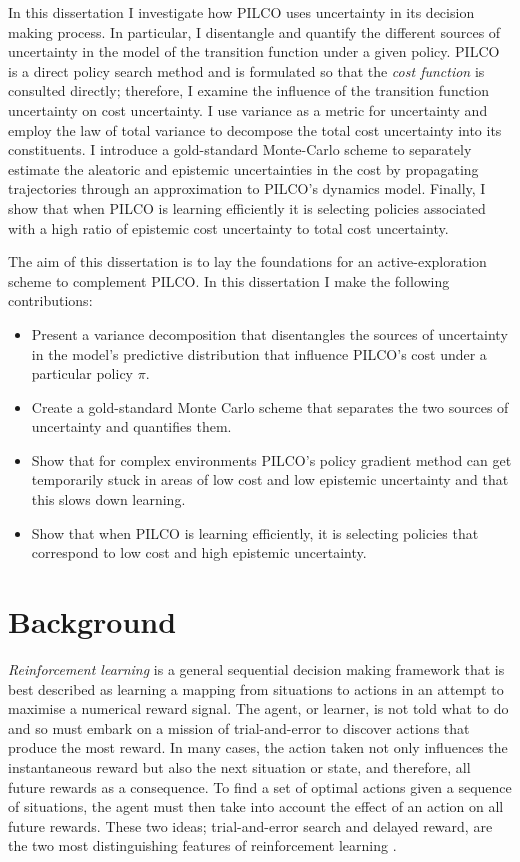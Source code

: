 In this dissertation I investigate how PILCO uses uncertainty in its decision making process. In particular, I disentangle and quantify the different sources of uncertainty in the model of the transition function under a given policy. PILCO is a direct policy search method and is formulated so that the \textit{cost function} is consulted directly; therefore, I examine the influence of the transition function uncertainty on cost uncertainty. I use variance as a metric for uncertainty and employ the law of total variance to decompose the total cost uncertainty into its constituents. I introduce a gold-standard Monte-Carlo scheme to separately estimate the aleatoric and epistemic uncertainties in the cost by propagating trajectories through an approximation to PILCO's dynamics model. Finally, I show that when PILCO is learning efficiently it is selecting policies associated with a high ratio of epistemic cost uncertainty to total cost uncertainty.

The aim of this dissertation is to lay the foundations for an active-exploration scheme to complement PILCO. In this dissertation I make the following contributions:
\begin{itemize}
    \item Present a variance decomposition that disentangles the sources of uncertainty in the model's predictive distribution that influence PILCO's cost under a particular policy $\pi$.
    \item Create a gold-standard Monte Carlo scheme that separates the two sources of uncertainty and quantifies them.
    \item Show that for complex environments PILCO's policy gradient method can get temporarily stuck in areas of low cost and low epistemic uncertainty and that this slows down learning.
    \item Show that when PILCO is learning efficiently, it is selecting policies that correspond to low cost and high epistemic uncertainty. 
\end{itemize}

\section{Background} %
\label{S:background}
\textit{Reinforcement learning} is a general sequential decision making framework that is best described as learning a mapping from situations to actions in an attempt to maximise a numerical reward signal. The agent, or learner, is not told what to do and so must embark on a mission of trial-and-error to discover actions that produce the most reward. In many cases, the action taken not only influences the instantaneous reward but also the next situation or state, and therefore, all future rewards as a consequence. To find a set of optimal actions given a sequence of situations, the agent must then take into account the effect of an action on all future rewards. These two ideas; trial-and-error search and delayed reward, are the two most distinguishing features of reinforcement learning \citep{sutton2018reinforcement}.

